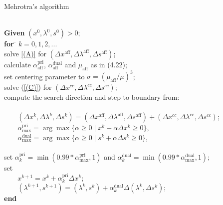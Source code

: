 \documentclass[a4paper,10 pt,titlepage,twoside]{book}
\theoremstyle{plain}
\theoremstyle{definition}
\theoremstyle{remark}
\begin{document}
\begin{algorithm}\caption{Mehrotra's algorithm}
\begin{tabbing}
	\\
	\textbf{Given} $(x^{0}, \lambda^{0}, s^{0})> 0$; \\
	\textbf{for} \= $k = 0, 1, 2,...$ \\
	\> solve \ref{(A)} for $(\Delta x^{\text{aff}},\Delta \lambda^{\text{aff}},\Delta s^{\text{aff}})$;\\
	\> calculate $\alpha_{\text{aff}}^{\text{pri}}$, $\alpha_{\text{aff}}^{\text{dual}}$ and $\mu_{\text{aff}}$ as in (4.22);\\
	\> set centering parameter to $\sigma = (\mu_{\text{aff}}/\mu)^{3}$; \\
	\> solve (\ref{(C)}) for $(\Delta x^{cc},\Delta \lambda^{cc},\Delta s^{cc})$;\\
	\> compute the search direction and step to boundary from: \\
	\> \\
	\> $\;\;\;\;\;\;\;(\Delta x^{k},\Delta \lambda^{k},\Delta s^{k})=(\Delta x^{\text{aff}},\Delta \lambda^{\text{aff}},\Delta s^{\text{aff}})+(\Delta x^{cc},\Delta  \lambda^{cc},\Delta s^{cc})$;\\
	\> $\;\;\;\;\;\;\;\alpha_{\text{max}}^{\text{pri}}=\arg\max\{\alpha\geq0\;|\;x^{k} +\alpha\Delta x^{k}\geq 0\}$,\\
	\> $\;\;\;\;\;\;\;\alpha_{\text{max}}^{\text{dual}}=\arg\max\{\alpha\geq0\;|\;s^{k} +\alpha\Delta s^{k}\geq 0\}$,\\
	\>\\
	\> set $\alpha_{k}^{\text{pri}}=\min(0.99\ast\alpha_{\text{max}}^{\text{pri}},1)$ and $\alpha_{k}^{\text{dual}}=\min(0.99\ast\alpha_{\text{max}}^{\text{dual}},1)$;\\
	\> set\\
	\> $\;\;\;\;\;\;\;x^{k+1} = x^{k} + \alpha_{k}^{\text{pri}}\Delta x^{k}$;\\
	\>$\;\;\;\;\;\;\;(\lambda^{k+1},s^{k+1}) = (\lambda^{k},s^{k}) + \alpha_{k}^{\text{dual}}\Delta (\lambda^{k},\Delta s^{k})$;\\
\textbf{end}
\end{tabbing}
\end{algorithm}
\end{document}
